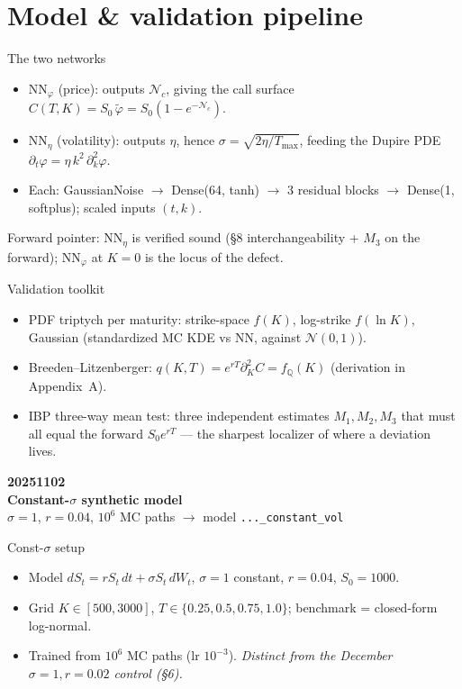 \documentclass[aspectratio=169,11pt]{beamer}
\newcommand{\gold}[1]{{\color{ntugold}#1}}
\newcommand{\daydivider}[3]{%
  \begin{frame}[plain]
    \vspace*{0.30\textheight}\hspace*{2.6cm}%
    \begin{minipage}{0.74\textwidth}
      {\color{ntured}\Large\bfseries #1}\\[0.35em]
      {\color{white}\fontsize{17}{21}\selectfont\bfseries #2}\\[0.5em]
      {\color{ntugold}\small #3}
    \end{minipage}
  \end{frame}}
\begin{document}
\section{Model \& validation pipeline}

\begin{frame}{The two networks}
  \begin{itemize}
    \item \gold{$\mathrm{NN}_\varphi$} (price): outputs $\mathcal{N}_c$, giving the call surface
          $C(T,K)=S_0\,\tilde\varphi=S_0(1-e^{-\mathcal{N}_c})$.
    \item \gold{$\mathrm{NN}_\eta$} (volatility): outputs $\eta$, hence $\sigma=\sqrt{2\eta/T_{\max}}$,
          feeding the Dupire PDE $\partial_t\varphi=\eta\,k^2\,\partial_k^2\varphi$.
    \item Each: GaussianNoise $\to$ Dense(64, tanh) $\to$ 3 residual blocks $\to$ Dense(1, softplus);
          scaled inputs $(t,k)$.
  \end{itemize}
  \vspace{0.3em}
  \gold{Forward pointer:} $\mathrm{NN}_\eta$ is verified sound (\S8 interchangeability + $M_3$ on the forward);
  $\mathrm{NN}_\varphi$ at $K=0$ is the locus of the defect.
\end{frame}

\begin{frame}{Validation toolkit}
  \begin{itemize}
    \item \gold{PDF triptych} per maturity: strike-space $f(K)$, log-strike $f(\ln K)$, Gaussian
          (standardized MC KDE vs NN, against $\mathcal{N}(0,1)$).
    \item \gold{Breeden--Litzenberger}: $q(K,T)=e^{rT}\partial_K^2C=f_{\mathbb{Q}}(K)$ (derivation in Appendix~A).
    \item \gold{IBP three-way mean test}: three independent estimates $M_1,M_2,M_3$ that must all equal
          the forward $S_0e^{rT}$ --- the sharpest localizer of where a deviation lives.
  \end{itemize}
\end{frame}

\daydivider{2025\text{-}11\text{-}02}{Constant-$\sigma$ synthetic model}{$\sigma{=}1$, $r{=}0.04$, $10^6$ MC paths \;$\to$\; model \texttt{...\_constant\_vol}}

\begin{frame}{Const-$\sigma$ setup}
  \begin{itemize}
    \item Model $dS_t=rS_t\,dt+\sigma S_t\,dW_t$, \gold{$\sigma=1$ constant}, $r=0.04$, $S_0=1000$.
    \item Grid $K\in[500,3000]$, $T\in\{0.25,0.5,0.75,1.0\}$; benchmark = closed-form log-normal.
    \item Trained from $10^6$ MC paths (lr $10^{-3}$). \emph{Distinct from the December $\sigma{=}1,r{=}0.02$ control (\S6).}
  \end{itemize}
\end{frame}
\end{document}
